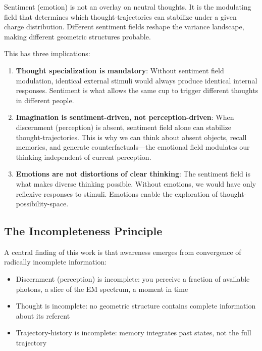 \documentclass[twocolumn,11pt,a4paper]{article}
\begin{document}
Sentiment (emotion) is not an overlay on neutral thoughts. It is the modulating field that determines which thought-trajectories can stabilize under a given charge distribution. Different sentiment fields reshape the variance landscape, making different geometric structures probable.

This has three implications:

\begin{enumerate}[label=(\arabic*),leftmargin=*]
\item \textbf{Thought specialization is mandatory}: Without sentiment field modulation, identical external stimuli would always produce identical internal responses. Sentiment is what allows the same cup to trigger different thoughts in different people.

\item \textbf{Imagination is sentiment-driven, not perception-driven}: When discernment (perception) is absent, sentiment field alone can stabilize thought-trajectories. This is why we can think about absent objects, recall memories, and generate counterfactuals—the emotional field modulates our thinking independent of current perception.

\item \textbf{Emotions are not distortions of clear thinking}: The sentiment field is what makes diverse thinking possible. Without emotions, we would have only reflexive responses to stimuli. Emotions enable the exploration of thought-possibility-space.

\end{enumerate}

\subsection{The Incompleteness Principle}

A central finding of this work is that awareness emerges from convergence of radically incomplete information:

\begin{itemize}
\item Discernment (perception) is incomplete: you perceive a fraction of available photons, a slice of the EM spectrum, a moment in time
\item Thought is incomplete: no geometric structure contains complete information about its referent
\item Trajectory-history is incomplete: memory integrates past states, not the full trajectory
\end{itemize}
\end{document}
